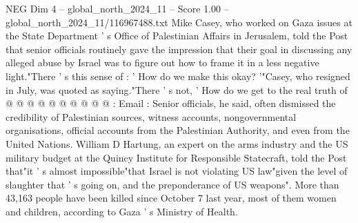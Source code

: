 \begin{textsample}{NEG Dim 4 – global\_north\_2024\_11 – Score 1.00 – global\_north\_2024\_11/116967488.txt}
Mike Casey, who worked on Gaza issues at the State Department ' s Office of Palestinian Affairs in Jerusalem, told the Post that senior officials routinely gave the impression that their goal in discussing any alleged abuse by Israel was to figure out how to frame it in a less negative light."There ' s this sense of : ' How do we make this okay? '"Casey, who resigned in July, was quoted as saying."There ' s not, ' How do we get to the real truth of @ @ @ @ @ @ @ @ @ @ : Email : Senior officials, he said, often dismissed the credibility of Palestinian sources, witness accounts, nongovernmental organisations, official accounts from the Palestinian Authority, and even from the United Nations.
William D Hartung, an expert on the arms industry and the US military budget at the Quincy Institute for Responsible Statecraft, told the Post that"it ' s almost impossible"that Israel is not violating US law"given the level of slaughter that ' s going on, and the preponderance of US weapons".
More than 43,163 people have been killed since October 7 last year, most of them women and children, according to Gaza ' s Ministry of Health.

\end{textsample}
